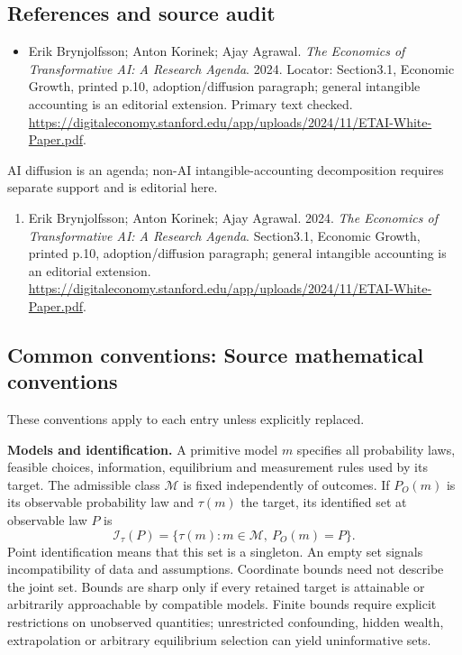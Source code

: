 \documentclass[11pt,a4paper]{article}
\begin{document}
\subsection*{References and source audit}
\begin{itemize}
\item Erik Brynjolfsson; Anton Korinek; Ajay Agrawal. \emph{The Economics of Transformative AI: A Research Agenda}. 2024. Locator: Section3.1, Economic Growth, printed p.10, adoption/diffusion paragraph; general intangible accounting is an editorial extension. Primary text checked. \url{https://digitaleconomy.stanford.edu/app/uploads/2024/11/ETAI-White-Paper.pdf}.
\end{itemize}
AI diffusion is an agenda; non-AI intangible-accounting decomposition requires separate support and is editorial here.
\begin{enumerate}\raggedright
\item\hypertarget{definitions:source:30007545:1}{} Erik Brynjolfsson; Anton Korinek; Ajay Agrawal. 2024. \emph{The Economics of Transformative AI: A Research Agenda}. Section3.1, Economic Growth, printed p.10, adoption/diffusion paragraph; general intangible accounting is an editorial extension.
\url{https://digitaleconomy.stanford.edu/app/uploads/2024/11/ETAI-White-Paper.pdf}.
\end{enumerate}

\subsection*{Common conventions: Source mathematical conventions}

These conventions apply to each entry unless explicitly replaced.

\textbf{Models and identification.} A primitive model \(m\) specifies all probability laws, feasible choices, information, equilibrium and measurement rules used by its target. The admissible class \(\mathcal M\) is fixed independently of outcomes. If \(P_O(m)\) is its observable probability law and \(\tau(m)\) the target, its identified set at observable law \(P\) is
\[
 \mathcal I_\tau(P)=\{\tau(m):m\in\mathcal M,\ P_O(m)=P\}.
\]
Point identification means that this set is a singleton. An empty set signals incompatibility of data and assumptions. Coordinate bounds need not describe the joint set. Bounds are sharp only if every retained target is attainable or arbitrarily approachable by compatible models. Finite bounds require explicit restrictions on unobserved quantities; unrestricted confounding, hidden wealth, extrapolation or arbitrary equilibrium selection can yield uninformative sets.
\end{document}
